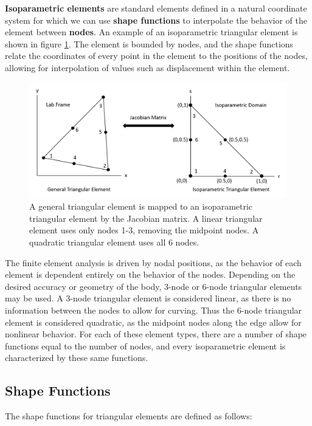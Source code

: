 \documentclass[]{spie}  %
\begin{document}
\textbf{Isoparametric elements} are standard elements defined in a natural coordinate system for which we can use \textbf{shape functions} to interpolate the behavior of the element between \textbf{nodes}. An example of an isoparametric triangular element is shown in figure \ref{fig: isoparametric triangular element}. The element is bounded by nodes, and the shape functions relate the coordinates of every point in the element to the positions of the nodes, allowing for interpolation of values such as displacement within the element.

\begin{figure}[h]
	\centering
	\includegraphics[width=7in]{isoparametric_triangular_element.png}
	\caption{A general triangular element is mapped to an isoparametric triangular element by the Jacobian matrix. A linear triangular element uses only nodes 1-3, removing the midpoint nodes. A quadratic triangular element uses all 6 nodes.} 
	\label{fig: isoparametric triangular element}
\end{figure}

The finite element analysis is driven by nodal positions, as the behavior of each element is dependent entirely on the behavior of the nodes. Depending on the desired accuracy or geometry of the body, 3-node or 6-node triangular elements may be used. A 3-node triangular element is considered linear, as there is no information between the nodes to allow for curving. Thus the 6-node triangular element is considered quadratic, as the midpoint nodes along the edge allow for nonlinear behavior. For each of these element types, there are a number of shape functions equal to the number of nodes, and every isoparametric element is characterized by these same functions.

\subsection{Shape Functions}
The shape functions for triangular elements are defined as follows:
\end{document}
